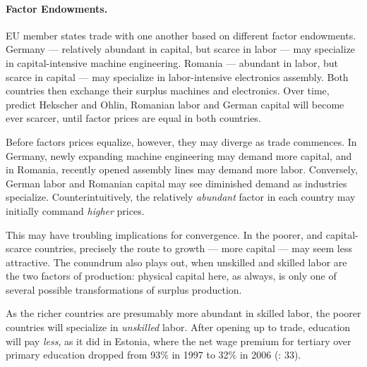 \documentclass[11pt,a4paper,oneside,openright]{article}
\begin{document}
\paragraph{Factor Endowments.} \gls{EU} member states trade with one another based on different factor endowments. Germany --- relatively abundant in capital, but scarce in labor --- may specialize in capital-intensive machine engineering. Romania --- abundant in labor, but scarce in capital --- may specialize in labor-intensive electronics assembly. Both countries then exchange their surplus machines and electronics. Over time, predict Hekscher and Ohlin, Romanian labor and German capital will become ever scarcer, until factor prices are equal in both countries. %

Before factors prices equalize, however, they may diverge as trade commences. In Germany, newly expanding machine engineering may demand more capital, and in Romania, recently opened assembly lines may demand more labor. Conversely, German labor and Romanian capital may see diminished demand as industries specialize. Counterintuitively, the relatively \emph{abundant} factor in each country may initially command \emph{higher} prices. 

This may have troubling implications for convergence. In the poorer, and capital-scarce countries, precisely the route to growth --- more capital --- may seem less attractive. The conundrum also plays out, when unskilled and skilled labor are the two factors of production: physical capital here, as always, is only one of several possible transformations of surplus production. 

As the richer countries are presumably more abundant in skilled labor, the poorer countries will specialize in \emph{unskilled} labor. After opening up to trade, education will pay \emph{less}, as it did in Estonia, where the net wage premium for tertiary over primary education dropped from 93\% in 1997 to 32\% in 2006 (\citealt{Piatkowski2008}: 33).

\end{document}
